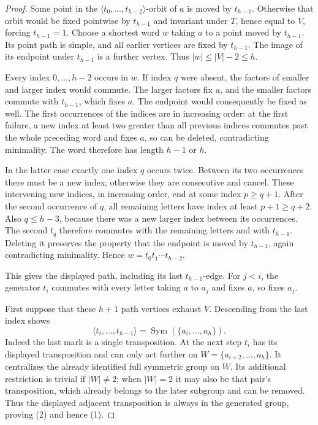 \documentclass[11pt,a4paper]{article}
\newcommand{\gen}[1]{\langle#1\rangle}
\newcommand{\Sym}{\operatorname{Sym}}
\begin{document}
\begin{proof}
Some point in the $\gen{t_0,\ldots,t_{h-2}}$-orbit of $a$ is
moved by $t_{h-1}$. Otherwise that orbit would be fixed pointwise
by $t_{h-1}$ and invariant under $T$, hence equal to $V$, forcing
$t_{h-1}=1$. Choose a shortest word $w$ taking $a$ to a point
moved by $t_{h-1}$. Its point path is simple, and all earlier
vertices are fixed by $t_{h-1}$. The image of its endpoint under
$t_{h-1}$ is a further vertex. Thus $|w|\leq |V|-2\leq h$.

Every index $0,\ldots,h-2$ occurs in $w$. If index $q$ were
absent, the factors of smaller and larger index would commute.
The larger factors fix $a$, and the smaller factors commute
with $t_{h-1}$, which fixes $a$. The endpoint would consequently
be fixed as well. The first occurrences of the indices are in
increasing order: at the first failure, a new index at least
two greater than all previous indices commutes past the whole
preceding word and fixes $a$, so can be deleted, contradicting
minimality. The word therefore has length $h-1$ or $h$.

In the latter case exactly one index $q$ occurs twice. Between
its two occurrences there must be a new index; otherwise they
are consecutive and cancel. These intervening new indices,
in increasing order, end at some index $p\geq q+1$. After the
second occurrence of $q$, all remaining letters have index at
least $p+1\geq q+2$. Also $q\leq h-3$, because there was a new
larger index between its occurrences. The second $t_q$ therefore
commutes with the remaining letters and with $t_{h-1}$. Deleting
it preserves the property that the endpoint is moved by
$t_{h-1}$, again contradicting minimality. Hence
$w=t_0t_1\cdots t_{h-2}$.

This gives the displayed path, including its last $t_{h-1}$-edge.
For $j<i$, the generator $t_i$ commutes with every letter taking
$a$ to $a_j$ and fixes $a$, so fixes $a_j$.

First suppose that these $h+1$ path vertices exhaust $V$.
Descending from the last index shows
\[
 \gen{t_i,\ldots,t_{h-1}}=\Sym(\{a_i,\ldots,a_h\}).     \tag{2}
\]
Indeed the last mark is a single transposition. At the next
step $t_i$ has its displayed transposition and can only act
further on $W=\{a_{i+2},\ldots,a_h\}$. It centralizes the
already identified full symmetric group on $W$. Its additional
restriction is trivial if $|W|\ne2$; when $|W|=2$ it may also
be that pair's transposition, which already belongs to the
later subgroup and can be removed. Thus the displayed adjacent
transposition is always in the generated group, proving (2)
and hence (1).


\end{proof}
\end{document}
